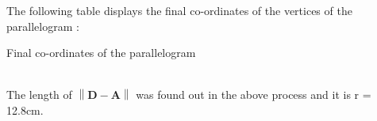 \documentclass{article}
\providecommand{\norm}[1]{\left\lVert#1\right\rVert}
\let\vec\mathbf
\begin{document}
The following table displays the final co-ordinates of the vertices of the parallelogram :\\
\begin{table}[h]
	\centering
	
	\caption{Final co-ordinates of the parallelogram}
	\label{tab:table6}
\end{table}\\
The length of $\norm{\vec{D} - \vec{A}}$ was found out in the above process and it is r = 12.8cm.
\end{document}
